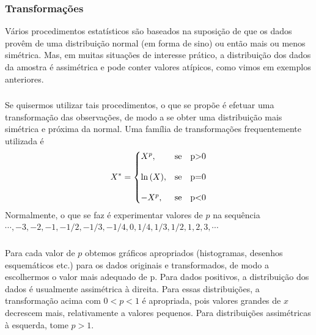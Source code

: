 \documentclass[14pt,aspectratio=1610]{beamer}
\begin{document}
\begin{frame}{}
\frametitle{Transformações}
\begin{block}{}
\justifying
Vários procedimentos estatísticos são baseados na suposição de que os dados provêm
de uma distribuição normal (em forma de sino) ou então mais ou menos simétrica.
Mas, em muitas situações de interesse prático, a distribuição dos dados da amostra
é assimétrica e pode conter valores atípicos, como vimos em exemplos anteriores.
\end{block}
\end{frame}

\begin{frame}{}
\frametitle{}
\begin{block}{}
\justifying
Se quisermos utilizar tais procedimentos, o que se propõe é efetuar uma transformação
das observações, de modo a se obter uma distribuição mais simétrica e próxima
da normal. Uma família de transformações frequentemente utilizada é
\[
X^{*}=\left\{
\setlength\arraycolsep{0pt}
\begin{array}{lr}
X^{p},                              &\quad \textrm{se}\quad $p>0$\\
&\\
\ln{(X)},                           &\quad \textrm{se}\quad $p=0$\\
&\\
-X^{p},                             &\quad \textrm{se}\quad $p<0$\\
\end{array}
\right.
\]
Normalmente, o que se faz é experimentar valores de $p$ na sequência 
$\cdots, -3, -2, -1, -1/2, -1/3, -1/4, 0, 1/4, 1/3, 1/2, 1, 2, 3,\cdots$
\end{block}
\end{frame}

\begin{frame}{}
\frametitle{}
\begin{block}{}
\justifying
Para cada valor de $p$ obtemos gráficos apropriados (histogramas, desenhos esquemáticos etc.)
para os dados originais e transformados, de modo a escolhermos o valor mais adequado de p. Para dados positivos, 
a distribuição dos dados é usualmente assimétrica à direita. Para essas distribuições, a transformação acima com 
$0 < p < 1$ é apropriada, pois valores grandes de $x$ decrescem mais, relativamente a valores pequenos. Para distribuições assimétricas à esquerda, tome $p > 1.$
\end{block}
\end{frame}
\end{document}
